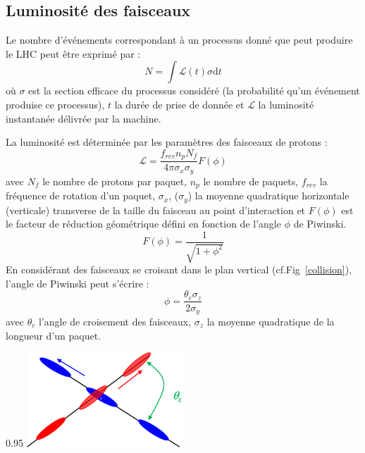 \subsection{Luminosité des faisceaux}
Le nombre d'événements correspondant à un processus donné que peut produire le LHC peut être exprimé par :
\begin{equation}
N=\int \mathcal{L}(t)\sigma \mathrm dt
\end{equation}
où $\sigma$ est la section efficace du processus considéré (la probabilité qu'un événement produise ce processus), $t$ la durée de prise de donnée et $\mathcal{L}$ la luminosité instantanée délivrée par la machine.

La luminosité est déterminée par les paramètres des faisceaux de protons :
\begin{equation}
\mathcal{L}=\frac{f_{rev}n_{p}N_{f}}{4\pi \sigma_{x} \sigma_{y}} F(\phi)
\end{equation}
avec $N_{f}$ le nombre de protons par paquet, $n_{p}$ le nombre de paquets, $f_{rev}$ la fréquence de rotation d'un paquet, $\sigma_{x}$, ($\sigma_{y}$) la moyenne quadratique horizontale (verticale) transverse de la taille du faisceau au point d'interaction et $F(\phi)$ est le facteur de réduction géométrique défini en fonction de l'angle $\phi$ de Piwinski.
\begin{equation}
F(\phi)=\frac{1}{\sqrt{1+\phi^{2}}}
\end{equation}
En considérant des faisceaux se croisant dans le plan vertical (cf.Fig~\ref{collision}), l'angle de Piwinski peut s'écrire :
\begin{equation}
\phi=\frac{\theta_{c}\sigma_{z}}{2\sigma_{y}}
\end{equation}
avec $\theta_{c}$ l'angle de croisement des faisceaux, $\sigma_{z}$ la moyenne quadratique de la longueur d'un paquet.


\begin{minipagewithmarginpars}[ht!]{0.95\textwidth}
\centering
\includegraphics[width=0.45\textwidth]{LHC/collision.png}
\label{collision}	
\end{minipagewithmarginpars}

